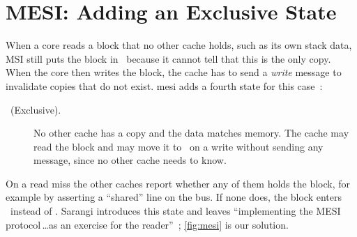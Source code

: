 \section{MESI: Adding an Exclusive State}
\label{sec:fam-mesi}
%

When a core reads a block that no other cache holds, such as its own stack
data, MSI still puts the block in \stS\ because it cannot tell that this is the
only copy. When the core then writes the block, the cache has to send a
\textit{write} message to invalidate copies that do not exist.
\Gls{mesi} adds a fourth state for this case~\cite{papamarcos1984illinois}:

\begin{description}
  \item[\stE\ (Exclusive).] No other cache has a copy and the data matches
    memory. The cache may read the block and may move it to \stM\ on a write
    without sending any message, since no other cache needs to know.
\end{description}

On a read miss the other caches report whether any of them holds the block, for
example by asserting a ``shared'' line on the bus. If none does, the block enters
\stE\ instead of \stS. Sarangi introduces this state and leaves ``implementing
the MESI protocol\,\ldots as an exercise for the
reader''~\cite[\S12.4.6, p.~603]{sarangi2025basic}; \cref{fig:mesi} is our
solution.

